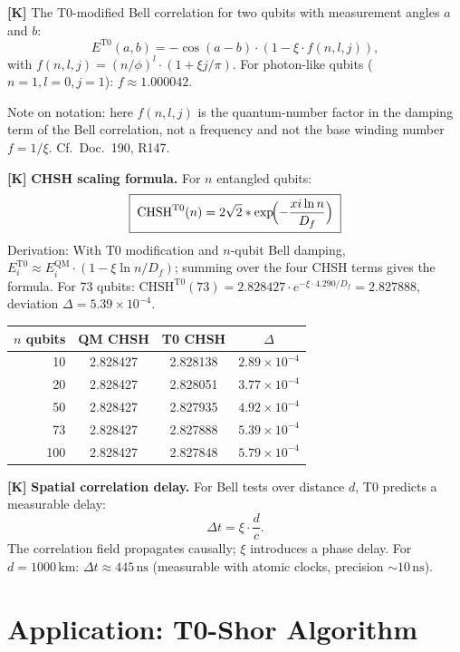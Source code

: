 \textbf{[K]} The T0-modified Bell correlation for two qubits with measurement
angles $a$ and $b$:
\[
  E^{\text{T0}}(a,b) = -\cos(a-b)\cdot(1-\xi\cdot f(n,l,j)),
\]
with $f(n,l,j)=(n/\phi)^l\cdot(1+\xi j/\pi)$. For photon-like qubits
($n=1,l=0,j=1$): $f\approx1{.}000042$.

Note on notation: here $f(n,l,j)$ is the quantum-number factor in the damping
term of the Bell correlation, not a frequency and not the base winding number
$f = 1/\xi$. Cf.\ Doc.~190, R147.

\textbf{[K]} \textbf{CHSH scaling formula.} For $n$ entangled qubits:
\[
  \boxed{\;\text{CHSH}^{\text{T0}}(n)
  = 2\sqrt2\cdot\exp\!\Bigl(-\frac{\xi\ln n}{D_f}\Bigr)\;}
\]
Derivation: With T0 modification and $n$-qubit Bell damping,
$E_i^{\text{T0}}\approx E_i^{\text{QM}}\cdot(1-\xi\ln n/D_f)$; summing over
the four CHSH terms gives the formula. For 73 qubits:
$\text{CHSH}^{\text{T0}}(73) = 2{.}828427\cdot e^{-\xi\cdot4{.}290/D_f}
= 2{.}827888$, deviation $\Delta=5{.}39\times10^{-4}$.

\begin{center}
\renewcommand{\arraystretch}{1.3}
{\small
\begin{tabular}{rccc}
\toprule
$n$ qubits & QM CHSH & T0 CHSH & $\Delta$ \\
\midrule
10  & 2.828427 & 2.828138 & $2{.}89\times10^{-4}$ \\
20  & 2.828427 & 2.828051 & $3{.}77\times10^{-4}$ \\
50  & 2.828427 & 2.827935 & $4{.}92\times10^{-4}$ \\
73  & 2.828427 & 2.827888 & $5{.}39\times10^{-4}$ \\
100 & 2.828427 & 2.827848 & $5{.}79\times10^{-4}$ \\
\bottomrule
\end{tabular}
}
\renewcommand{\arraystretch}{1.0}
\end{center}

\textbf{[K]} \textbf{Spatial correlation delay.} For Bell tests over distance
$d$, T0 predicts a measurable delay:
\[
  \Delta t = \xi\cdot\frac{d}{c}.
\]
The correlation field propagates causally; $\xi$ introduces a phase delay.
For $d=1000\,\text{km}$: $\Delta t\approx445\,\text{ns}$ (measurable with atomic
clocks, precision $\sim10\,\text{ns}$).

\section{Application: T0-Shor Algorithm}

